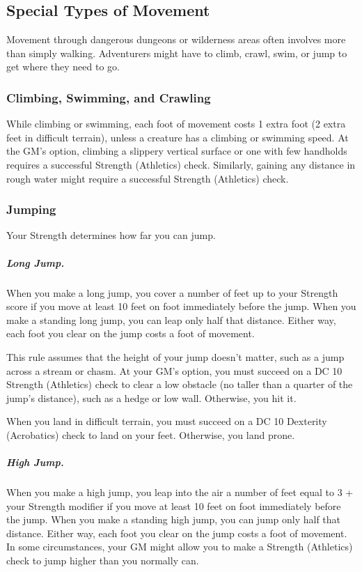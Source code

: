 \subsection{Special Types of Movement}

Movement through dangerous dungeons or wilderness areas often involves more than simply walking. Adventurers might have to climb, crawl, swim, or jump to get where they need to go.

\subsubsection{Climbing, Swimming, and Crawling}

While climbing or swimming, each foot of movement costs 1 extra foot (2 extra feet in difficult terrain), unless a creature has a climbing or swimming speed. At the GM's option, climbing a slippery vertical surface or one with few handholds requires a successful Strength (Athletics) check. Similarly, gaining any distance in rough water might require a successful Strength (Athletics) check.

\subsubsection{Jumping}

Your Strength determines how far you can jump.

\subparagraph*{Long Jump.} When you make a long jump, you cover a number of feet up to your Strength score if you move at least 10 feet on foot immediately before the jump. When you make a standing long jump, you can leap only half that distance. Either way, each foot you clear on the jump costs a foot of movement.

This rule assumes that the height of your jump doesn't matter, such as a jump across a stream or chasm. At your GM's option, you must succeed on a DC 10 Strength (Athletics) check to clear a low obstacle (no taller than a quarter of the jump's distance), such as a hedge or low wall. Otherwise, you hit it.

When you land in difficult terrain, you must succeed on a DC 10 Dexterity (Acrobatics) check to land on your feet. Otherwise, you land prone.

\subparagraph*{High Jump.} When you make a high jump, you leap into the air a number of feet equal to 3 + your Strength modifier if you move at least 10 feet on foot immediately before the jump. When you make a standing high jump, you can jump only half that distance. Either way, each foot you clear on the jump costs a foot of movement. In some circumstances, your GM might allow you to make a Strength (Athletics) check to jump higher than you normally can.

